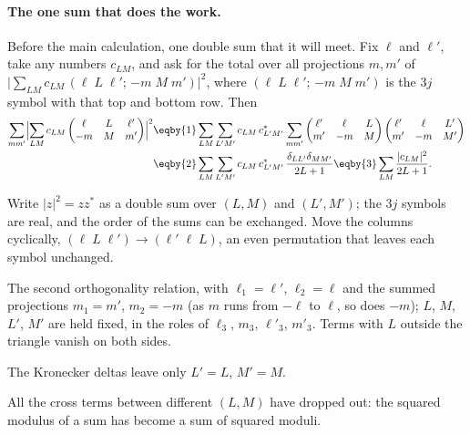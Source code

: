 \paragraph{The one sum that does the work.}
Before the main calculation, one double sum that it will meet. Fix $\ell$ and $\ell'$, take any numbers
$c_{LM}$, and ask for the total over all projections $m,m'$ of
$\bigl|\sum_{LM}c_{LM}\,(\ell\;L\;\ell';\,{-m}\;M\;m')\bigr|^2$, where $(\ell\;L\;\ell';\,{-m}\;M\;m')$ is the $3j$ symbol with
that top and bottom row. Then
\begin{align}
  \sum_{mm'}\Bigl|\sum_{LM}c_{LM}\begin{pmatrix}\ell&L&\ell'\\-m&M&m'\end{pmatrix}\Bigr|^2
  &\eqby{1}\sum_{LM}\sum_{L'M'}c_{LM}\,c^*_{L'M'}\sum_{mm'}
     \begin{pmatrix}\ell'&\ell&L\\m'&-m&M\end{pmatrix}\begin{pmatrix}\ell'&\ell&L'\\m'&-m&M'\end{pmatrix}
   \nonumber\\
  &\eqby{2}\sum_{LM}\sum_{L'M'}c_{LM}\,c^*_{L'M'}\,\frac{\delta_{LL'}\delta_{MM'}}{2L+1}
   \eqby{3}\sum_{LM}\frac{|c_{LM}|^2}{2L+1} .
  \label{8b:eq:3j-collapse}
\end{align}
\begin{explain}
  \item Write $|z|^2=zz^*$ as a double sum over $(L,M)$ and $(L',M')$; the $3j$ symbols are real, and the
        order of the sums can be exchanged. Move the columns cyclically,
        $(\ell\;L\;\ell')\to(\ell'\;\ell\;L)$, an even permutation that leaves each symbol unchanged.
  \item The second orthogonality relation, with $\ell_1=\ell'$, $\ell_2=\ell$ and the summed projections
        $m_1=m'$, $m_2=-m$ (as $m$ runs from $-\ell$ to $\ell$, so does $-m$); $L$, $M$, $L'$, $M'$ are held fixed, in
        the roles of $\ell_3$, $m_3$, $\ell'_3$, $m'_3$. Terms with $L$ outside the triangle vanish on both sides.
  \item The Kronecker deltas leave only $L'=L$, $M'=M$.
\end{explain}
All the cross terms between different $(L,M)$ have dropped out: the squared modulus of a sum has
become a sum of squared moduli.

